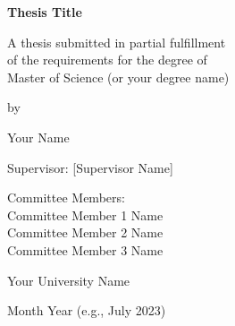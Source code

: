 \hypersetup{pageanchor=false} %
\begin{titlepage}
  \centering
  \vspace*{1cm}
  
  \Huge{\textbf{Thesis Title}}
  
  \vspace{2cm}
  
  \Large{A thesis submitted in partial fulfillment\\
  of the requirements for the degree of\\
  Master of Science (or your degree name)}
  
  \vspace{2cm}
  
  \Large{by}
  
  \vspace{1cm}
  
  \Large{Your Name}
  
  \vfill
  
  \Large{Supervisor: [Supervisor Name]} %
  
  \vspace{0.5cm}
  
  \Large{Committee Members:}\\ %
    Committee Member 1 Name \\
    Committee Member 2 Name \\
    Committee Member 3 Name
  
  \vspace{1cm}
  
  \Large{Your University Name}
  
  \vspace{1cm}
  
  \Large{Month Year (e.g., July 2023)}
  
\end{titlepage}
